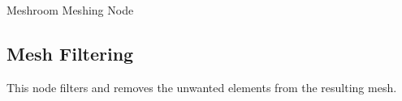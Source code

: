 \documentclass[12pt]{report}
\begin{document}

    

    \begin{table}[H]
      \centering
      \caption{Meshroom Meshing Node}
      \label{tab:Meshing}
      \end{table}      
\newpage
\subsection{Mesh Filtering}

This node filters and removes the unwanted elements from the resulting mesh.
\end{document}
